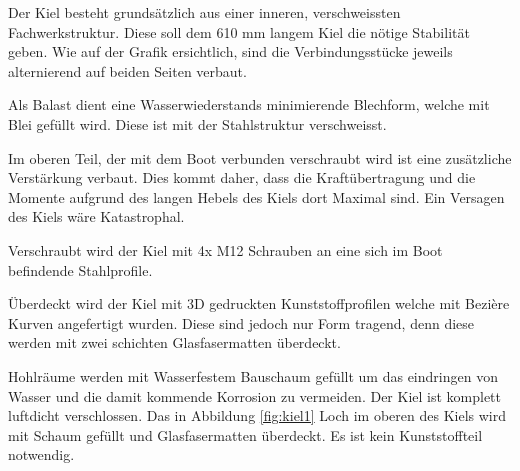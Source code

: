 Der Kiel besteht grundsätzlich aus einer inneren, verschweissten Fachwerkstruktur. Diese soll dem 610 mm langem Kiel die nötige Stabilität geben. Wie auf der Grafik ersichtlich, sind die Verbindungsstücke jeweils alternierend auf beiden Seiten verbaut.

Als Balast dient eine Wasserwiederstands minimierende Blechform, welche mit Blei gefüllt wird. Diese ist mit der Stahlstruktur verschweisst. 

Im oberen Teil, der mit dem Boot verbunden verschraubt wird ist eine zusätzliche Verstärkung verbaut. Dies kommt daher, dass die Kraftübertragung und die Momente aufgrund des langen Hebels des Kiels dort Maximal sind. Ein Versagen des Kiels wäre Katastrophal. 

Verschraubt wird der Kiel mit 4x M12 Schrauben an eine sich im Boot befindende Stahlprofile. 

Überdeckt wird der Kiel mit 3D gedruckten Kunststoffprofilen welche mit Bezière Kurven angefertigt wurden. Diese sind jedoch nur Form tragend, denn diese werden mit zwei schichten Glasfasermatten überdeckt.

Hohlräume werden mit Wasserfestem Bauschaum gefüllt um das eindringen von Wasser und die damit kommende Korrosion zu vermeiden. Der Kiel ist komplett luftdicht verschlossen. Das in Abbildung  \ref{fig:kiel1} Loch im oberen des Kiels wird mit Schaum gefüllt und Glasfasermatten überdeckt. Es ist kein Kunststoffteil notwendig. 


